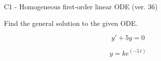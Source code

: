 \begin{exercise}
  \begin{exerciseTitle}C1 - Homogeneous first-order linear ODE (ver. 36)\end{exerciseTitle}
  \begin{exerciseStatement}
    
Find the general solution to the given ODE.

    
\[y'+5y=0\]

  \end{exerciseStatement}
  \begin{exerciseAnswer}
    
\[y= k e^{\left(-5 \, t\right)}\]

  \end{exerciseAnswer}
\end{exercise}